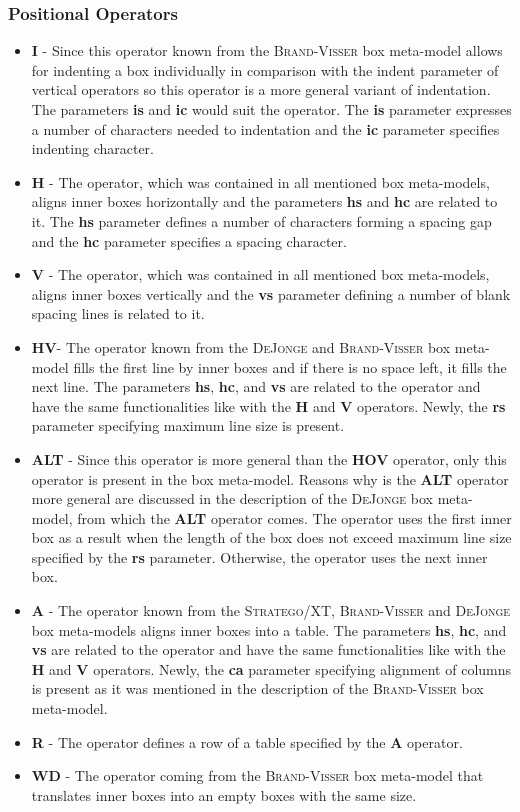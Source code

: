 \documentclass[12pt,notitlepage,a4paper]{report}
\begin{document}
\subsubsection{Positional Operators}
\begin{itemize}
\item \textbf{I} - Since this operator known from the \textsc{Brand-Visser} box meta-model allows for indenting a box individually in comparison with the indent parameter of vertical operators so this operator is a more general variant of indentation. The parameters \textbf{is} and \textbf{ic} would suit the operator. The \textbf{is} parameter expresses a number of characters needed to indentation and the \textbf{ic} parameter specifies indenting character.
\item \textbf{H} - The operator, which was contained in all mentioned box meta-models, aligns inner boxes horizontally and the parameters \textbf{hs} and \textbf{hc} are related to it. The \textbf{hs} parameter defines a number of characters forming a spacing gap and the \textbf{hc} parameter specifies a spacing character.
\item \textbf{V} -  The operator, which was contained in all mentioned box meta-models, aligns inner boxes vertically and the \textbf{vs} parameter defining a number of blank spacing lines is related to it.
\item \textbf{HV}- The operator known from the \textsc{DeJonge} and \textsc{Brand-Visser} box meta-model fills the first line by inner boxes and if there is no space left, it fills the next line. The parameters \textbf{hs}, \textbf{hc}, and \textbf{vs} are related to the operator and have the same functionalities like with the \textbf{H} and \textbf{V} operators. Newly, the \textbf{rs} parameter specifying maximum line size is present.
\item \textbf{ALT} - Since this operator is more general than the \textbf{HOV} operator,  only this operator is present in the box meta-model. Reasons why is the \textbf{ALT} operator more general are discussed in the description of the \textsc{DeJonge} box meta-model, from which the \textbf{ALT} operator comes. The operator uses the first inner box as a result when the length of the box does not exceed maximum line size specified by the \textbf{rs} parameter. Otherwise, the operator uses the next inner box.
\item \textbf{A} - The operator known from the \textsc{Stratego/XT}, \textsc{Brand-Visser} and \textsc{DeJonge} box meta-models aligns inner boxes into a table. The parameters \textbf{hs}, \textbf{hc}, and \textbf{vs} are related to the operator and have the same functionalities like with the \textbf{H} and \textbf{V} operators. Newly, the \textbf{ca} parameter specifying alignment of columns is present  as it was mentioned in the description of the \textsc{Brand-Visser} box meta-model.
\item \textbf{R} - The operator defines a row of a table specified by the \textbf{A} operator.
\item \textbf{WD} - The operator coming from the \textsc{Brand-Visser} box meta-model that translates inner boxes into an empty boxes with the same size.
\end{itemize}
\end{document}
